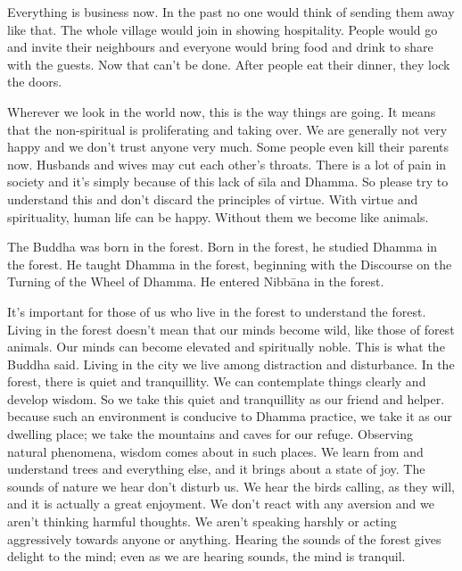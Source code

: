 Everything is business now. In the past no one would think of sending them away like that. The whole village would join in showing hospitality. People would go and invite their neighbours and everyone would bring food and drink to share with the guests. Now that can't be done. After people eat their dinner, they lock the doors. 

Wherever we look in the world now, this is the way things are going. It means that the non-spiritual is proliferating and taking over. We are generally not very happy and we don't trust anyone very much. Some people even kill their parents now. Husbands and wives may cut each other's throats. There is a lot of pain in society and it's simply because of this lack of s\={\i}la and Dhamma. So please try to understand this and don't discard the principles of virtue. With virtue and spirituality, human life can be happy. Without them we become like animals. 

The Buddha was born in the forest. Born in the forest, he studied Dhamma in the forest. He taught Dhamma in the forest, beginning with the Discourse on the Turning of the Wheel of Dhamma. He entered Nibb\=ana in the forest. 

It's important for those of us who live in the forest to understand the forest. Living in the forest doesn't mean that our minds become wild, like those of forest animals. Our minds can become elevated and spiritually noble. This is what the Buddha said. Living in the city we live among distraction and disturbance. In the forest, there is quiet and tranquillity. We can contemplate things clearly and develop wisdom. So we take this quiet and tranquillity as our friend and helper. because such an environment is conducive to Dhamma practice, we take it as our dwelling place; we take the mountains and caves for our refuge. Observing natural phenomena, wisdom comes about in such places. We learn from and understand trees and everything else, and it brings about a state of joy. The sounds of nature we hear don't disturb us. We hear the birds calling, as they will, and it is actually a great enjoyment. We don't react with any aversion and we aren't thinking harmful thoughts. We aren't speaking harshly or acting aggressively towards anyone or anything. Hearing the sounds of the forest gives delight to the mind; even as we are hearing sounds, the mind is tranquil. 

